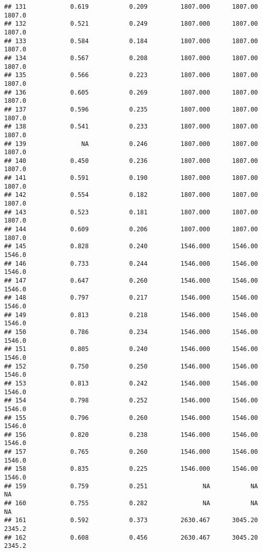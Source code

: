 \documentclass[
]{article}
\begin{document}
\begin{verbatim}
## 131            0.619           0.209         1807.000      1807.00       1807.0
## 132            0.521           0.249         1807.000      1807.00       1807.0
## 133            0.584           0.184         1807.000      1807.00       1807.0
## 134            0.567           0.208         1807.000      1807.00       1807.0
## 135            0.566           0.223         1807.000      1807.00       1807.0
## 136            0.605           0.269         1807.000      1807.00       1807.0
## 137            0.596           0.235         1807.000      1807.00       1807.0
## 138            0.541           0.233         1807.000      1807.00       1807.0
## 139               NA           0.246         1807.000      1807.00       1807.0
## 140            0.450           0.236         1807.000      1807.00       1807.0
## 141            0.591           0.190         1807.000      1807.00       1807.0
## 142            0.554           0.182         1807.000      1807.00       1807.0
## 143            0.523           0.181         1807.000      1807.00       1807.0
## 144            0.609           0.206         1807.000      1807.00       1807.0
## 145            0.828           0.240         1546.000      1546.00       1546.0
## 146            0.733           0.244         1546.000      1546.00       1546.0
## 147            0.647           0.260         1546.000      1546.00       1546.0
## 148            0.797           0.217         1546.000      1546.00       1546.0
## 149            0.813           0.218         1546.000      1546.00       1546.0
## 150            0.786           0.234         1546.000      1546.00       1546.0
## 151            0.805           0.240         1546.000      1546.00       1546.0
## 152            0.750           0.250         1546.000      1546.00       1546.0
## 153            0.813           0.242         1546.000      1546.00       1546.0
## 154            0.798           0.252         1546.000      1546.00       1546.0
## 155            0.796           0.260         1546.000      1546.00       1546.0
## 156            0.820           0.238         1546.000      1546.00       1546.0
## 157            0.765           0.260         1546.000      1546.00       1546.0
## 158            0.835           0.225         1546.000      1546.00       1546.0
## 159            0.759           0.251               NA           NA           NA
## 160            0.755           0.282               NA           NA           NA
## 161            0.592           0.373         2630.467      3045.20       2345.2
## 162            0.608           0.456         2630.467      3045.20       2345.2

\end{verbatim}
\end{document}
